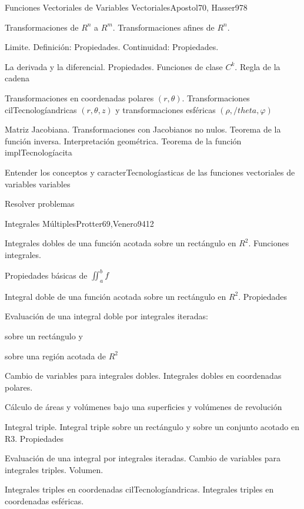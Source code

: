 \begin{syllabus}
\begin{unit}{Funciones Vectoriales de Variables Vectoriales}{Apostol70, Hasser97}{8}
   \begin{topics}
         \item  Transformaciones de $R^n$ a $R^m$. Transformaciones afines de $R^n$.
	 \item  Limite. Definición: Propiedades. Continuidad: Propiedades.
         \item  La derivada y la diferencial. Propiedades. Funciones de clase $C^k$. Regla de la cadena
	 \item  Transformaciones en coordenadas polares $(r,\theta)$. Transformaciones cilTecnologíandricas  $(r,\theta,z)$ y transformaciones esféricas $(\rho,/theta,\varphi)$
         \item  Matriz Jacobiana. Transformaciones con Jacobianos no nulos. Teorema de la función inversa. Interpretación geométrica. Teorema de la función implTecnologíacita
   \end{topics}

   \begin{unitgoals}
         \item  Entender los conceptos y caracterTecnologíasticas de las funciones vectoriales de variables variables
         \item  Resolver problemas
   \end{unitgoals}
\end{unit}

\begin{unit}{Integrales Múltiples}{Protter69,Venero94}{12}
   \begin{topics}
         \item  Integrales dobles de una función acotada sobre un rectángulo en $R^2$. Funciones integrales.
	 \item  Propiedades básicas de $\iint_{a}^{b} f$
         \item  Integral doble de una función acotada sobre un rectángulo en $R^2$. Propiedades
	 \item  Evaluación de una integral doble por integrales iteradas:
	\begin{subtopicos}
		\item sobre un rectángulo y
		\item sobre una región acotada de $R^2$
	\end{subtopicos}
         \item  Cambio de variables para integrales dobles. Integrales dobles en coordenadas polares.
	 \item  Cálculo de áreas y volúmenes bajo una superficies y volúmenes de revolución
         \item  Integral triple. Integral triple sobre un rectángulo y sobre un conjunto acotado en R3. Propiedades
	\item Evaluación de una integral por integrales iteradas. Cambio de variables para integrales triples. Volumen.
	\item Integrales triples en coordenadas cilTecnologíandricas. Integrales triples en coordenadas esféricas.
   \end{topics}


\end{unit}
\end{syllabus}
